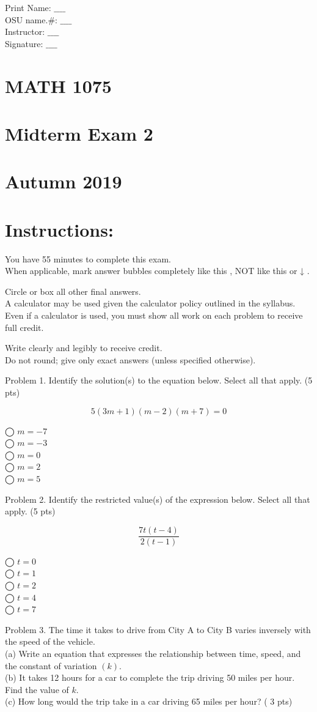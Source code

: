 \documentclass{ximera}
\begin{document}
Print Name: $\_\_\_\_$\\
OSU name.\#: $\_\_\_\_$\\
Instructor: $\_\_\_\_$\\
Signature: $\_\_\_\_$

\section*{MATH 1075}
\section*{Midterm Exam 2}
\section*{Autumn 2019}
\section*{Instructions:}
You have 55 minutes to complete this exam.\\
When applicable, mark answer bubbles completely like this , NOT like this or ↓ .

Circle or box all other final answers.\\
A calculator may be used given the calculator policy outlined in the syllabus. Even if a calculator is used, you must show all work on each problem to receive full credit.

Write clearly and legibly to receive credit.\\
Do not round; give only exact answers (unless specified otherwise).

Problem 1. Identify the solution(s) to the equation below. Select all that apply. (5 pts)

$$5(3 m+1)(m-2)(m+7)=0$$

◯ $m=-7$\\
◯ $m=-3$\\
◯ $m=0$\\
◯ $m=2$\\
◯ $m=5$

Problem 2. Identify the restricted value(s) of the expression below. Select all that apply. (5 pts)

$$\frac{7 t(t-4)}{2(t-1)}$$

◯ $t=0$\\
◯ $t=1$\\
◯ $t=2$\\
◯ $t=4$\\
◯ $t=7$

Problem 3. The time it takes to drive from City A to City B varies inversely with the speed of the vehicle.\\
(a) Write an equation that expresses the relationship between time, speed, and the constant of variation $(k)$.\\
(b) It takes 12 hours for a car to complete the trip driving 50 miles per hour. Find the value of $k$.\\
(c) How long would the trip take in a car driving 65 miles per hour? ( 3 pts)
\end{document}
